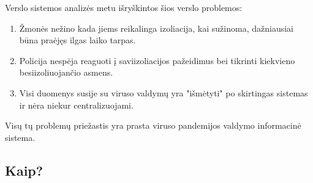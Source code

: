 \documentclass{VUMIFPSkursinis}
\begin{document}
Verslo sistemos analizės metu išryškintos šios verslo problemos:
\begin{enumerate}
	\item Žmonės nežino kada jiems reikalinga izoliacija, kai sužinoma, dažniausiai būna praėjęs ilgas laiko tarpas.
	\item Policija nespėja reaguoti į saviizoliacijos pažeidimus bei tikrinti kiekvieno besiizoliuojančio asmens.
	\item Visi duomenys susije su viruso valdymų yra "išmėtyti" po skirtingas sistemas ir nėra niekur centralizuojami.
\end{enumerate}

Visų tų problemų priežastis yra prasta viruso pandemijos valdymo informacinė sistema.

\subsection{Kaip?}\label{sec:ISReqHow}
\end{document}
